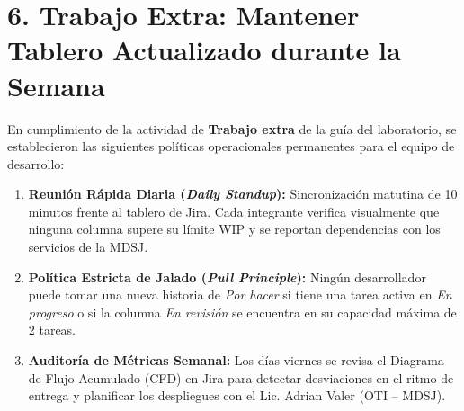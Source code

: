 \section{6. Trabajo Extra: Mantener Tablero Actualizado durante la Semana}

En cumplimiento de la actividad de \textbf{Trabajo extra} de la guía del laboratorio, se establecieron las siguientes políticas operacionales permanentes para el equipo de desarrollo:

\begin{enumerate}[leftmargin=*]
    \item \textbf{Reunión Rápida Diaria (\textit{Daily Standup}):} Sincronización matutina de 10 minutos frente al tablero de Jira. Cada integrante verifica visualmente que ninguna columna supere su límite WIP y se reportan dependencias con los servicios de la MDSJ.
    \item \textbf{Política Estricta de Jalado (\textit{Pull Principle}):} Ningún desarrollador puede tomar una nueva historia de \textit{Por hacer} si tiene una tarea activa en \textit{En progreso} o si la columna \textit{En revisión} se encuentra en su capacidad máxima de 2 tareas.
    \item \textbf{Auditoría de Métricas Semanal:} Los días viernes se revisa el Diagrama de Flujo Acumulado (CFD) en Jira para detectar desviaciones en el ritmo de entrega y planificar los despliegues con el Lic. Adrian Valer (OTI -- MDSJ).
\end{enumerate}
